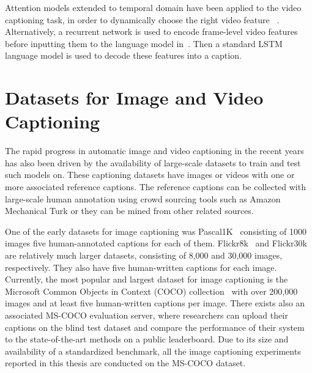 Attention models extended to temporal domain have been applied to the video
captioning task, in order to dynamically choose the right video feature
~\cite{yao2015describing}.
%
Alternatively, a recurrent network is used to encode frame-level video features
before inputting them to the language model in~\cite{venugopalan2015sequence}.
Then a standard LSTM language model is used to decode these features into a
caption.
\section{Datasets for Image and Video Captioning}
The rapid progress in automatic image and video captioning in the recent years
has also been driven by the availability of large-scale datasets to train and
test such models on. 
These captioning datasets have images or videos with one or more associated
reference captions.
The reference captions can be collected with large-scale human annotation using
crowd sourcing tools such as Amazon Mechanical Turk or they can be mined from
other related sources.

One of the early datasets for image captioning was 
Pascal1K~\cite{Rashtchian2010} consisting of 1000 images five human-annotated
captions for each of them.
Flickr8k~\cite{Hodosh2013} and Flickr30k~\cite{Young2014} are relatively much
larger datasets, consisting of 8,000 and 30,000 images, respectively. 
They also have five human-written captions for each image.
Currently, the most popular and largest dataset for image captioning is the
Microsoft Common Objects in Context (COCO) collection~\cite{Lin2014} with over
200,000 images and at least five human-written captions per image.
There exists also an associated MS-COCO evaluation server, where researchers can
upload their captions on the blind test dataset and compare the performance of
their system to the state-of-the-art methods on a public leaderboard.
Due to its size and availability of a standardized benchmark, all the image
captioning experiments reported in this thesis are conducted on the MS-COCO
dataset. 

